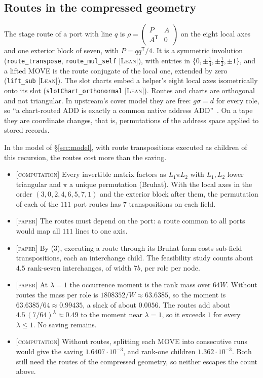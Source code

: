 \documentclass[11pt]{amsart}
\newcommand{\lean}[1]{\texttt{#1}}
\newcommand{\tagL}{\textsc{[Lean]}}
\newcommand{\tagP}{\textsc{[paper]}}
\newcommand{\tagC}{\textsc{[computation]}}
\begin{document}
\subsection{Routes in the compressed geometry}
The stage route of a port with line $q$ is $\rho = \begin{pmatrix} P & A\\ A^{\mathsf T} & 0
\end{pmatrix}$ on the eight local axes and one exterior block of seven, with $P = qq^{\mathsf T}/4$.
It is a symmetric involution (\lean{route\_transpose}, \lean{route\_mul\_self} \tagL{}), with
entries in $\{0, \pm\frac14, \pm\frac12, \pm 1\}$, and a lifted MOVE is the route conjugate of the
local one, extended by zero (\lean{lift\_sub} \tagL{}). The slot charts embed a helper's eight
local axes isometrically onto its slot (\lean{slotChart\_orthonormal} \tagL{}). Routes and charts
are orthogonal and not triangular. In upstream's cover model they are free: $g\sigma = d$ for every
role, so ``a chart-routed ADD is exactly a common native address ADD''~\cite[\S2]{FH}. On a tape
they are coordinate changes, that is, permutations of the address space applied to stored records.

In the model of \S\ref{sec:model}, with route transpositions executed as children of this
recursion, the routes cost more than the saving.
\begin{itemize}
\item \tagC{} Every invertible matrix factors as $L_1 \pi L_2$ with $L_1, L_2$ lower triangular and
  $\pi$ a unique permutation (Bruhat). With the local axes in the order $(3,0,2,4,6,5,7,1)$ and the
  exterior block after them, the permutation of each of the $111$ port routes has $7$
  transpositions on each field.
\item \tagP{} The routes must depend on the port: a route common to all ports would map all $111$
  lines to one axis.
\item \tagP{} By (3), executing a route through its Bruhat form costs sub-field transpositions,
  each an interchange child. The feasibility study counts about $4.5$ rank-seven interchanges, of
  width $7b$, per role per node.
\item \tagP{} At $\lambda = 1$ the occurrence moment is the rank mass over $64W$. Without routes
  the mass per role is $1808352/W \approx 63.6385$, so the moment is $63.6385/64 \approx 0.99435$,
  a slack of about $0.0056$. The routes add about $4.5\,(7/64)^{\lambda} \approx 0.49$ to the moment
  near $\lambda = 1$, so it exceeds $1$ for every $\lambda \le 1$. No saving remains.
\item \tagC{} Without routes, splitting each MOVE into consecutive runs would give the saving
  $1.6407 \cdot 10^{-3}$, and rank-one children $1.362 \cdot 10^{-3}$. Both still need the routes of
  the compressed geometry, so neither escapes the count above.
\end{itemize}
\end{document}
